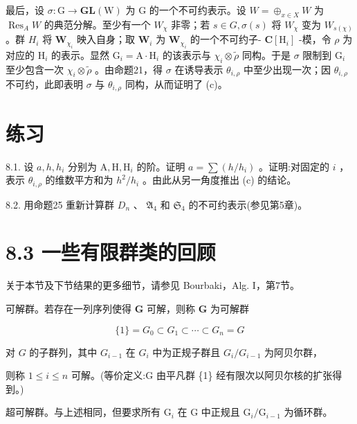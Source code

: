 \documentclass[10pt]{article}
\begin{document}
最后，设 \(\sigma  : \mathrm{G} \rightarrow  \mathbf{{GL}}\left( \mathrm{W}\right)\) 为 \(\mathrm{G}\) 的一个不可约表示。设 \(W = { \oplus  }_{x \in  X}W\) 为 \({\operatorname{Res}}_{A}W\) 的典范分解。至少有一个 \({W}_{\chi }\) 非零；若 \(s \in  G,\sigma \left( s\right)\) 将 \({W}_{\chi }\) 变为 \({W}_{s\left( \chi \right) }\) 。群 \({H}_{i}\) 将 \({\mathbf{W}}_{{\chi }_{i}}\) 映入自身；取 \({\mathbf{W}}_{i}\) 为 \({\mathbf{W}}_{{\chi }_{i}}\) 的一个不可约子- \(\mathbf{C}\left\lbrack  {\mathrm{H}}_{i}\right\rbrack\) -模，令 \(\rho\) 为对应的 \({\mathrm{H}}_{i}\) 的表示。显然 \({\mathrm{G}}_{i} = \mathrm{A} \cdot  {\mathrm{H}}_{i}\) 的该表示与 \({\chi }_{i} \otimes  \widetilde{\rho }\) 同构。于是 \(\sigma\) 限制到 \({\mathrm{G}}_{i}\) 至少包含一次 \({\chi }_{i} \otimes  \widetilde{\rho }\) 。由命题21，得 \(\sigma\) 在诱导表示 \({\theta }_{i,\rho }\) 中至少出现一次；因 \({\theta }_{i,\rho }\) 不可约，此即表明 \(\sigma\) 与 \({\theta }_{i,\rho }\) 同构，从而证明了 (c)。

\section*{练习}

8.1. 设 \(a,h,{h}_{i}\) 分别为 \(\mathrm{A},\mathrm{H},{\mathrm{H}}_{i}\) 的阶。证明 \(a = \sum \left( {h/{h}_{i}}\right)\) 。证明:对固定的 \(i\) ，表示 \({\theta }_{i,\rho }\) 的维数平方和为 \({h}^{2}/{h}_{i}\) 。由此从另一角度推出 (c) 的结论。

8.2. 用命题25 重新计算群 \({D}_{n}\) 、 \({\mathfrak{A}}_{4}\) 和 \({\mathfrak{S}}_{4}\) 的不可约表示(参见第5章)。

\section*{8.3 一些有限群类的回顾}

关于本节及下节结果的更多细节，请参见 Bourbaki，Alg. I，第7节。

可解群。若存在一列序列使得 \(\mathbf{G}\) 可解，则称 \(\mathbf{G}\) 为可解群

\[
\{ 1\}  = {G}_{0} \subset  {G}_{1} \subset  \cdots  \subset  {G}_{n} = G
\]

对 \(G\) 的子群列，其中 \({G}_{i - 1}\) 在 \({G}_{i}\) 中为正规子群且 \({G}_{i}/{G}_{i - 1}\) 为阿贝尔群，

则称 \(1 \leq  i \leq  n\) 可解。(等价定义:G 由平凡群 \{1\} 经有限次以阿贝尔核的扩张得到。)

超可解群。与上述相同，但要求所有 \({\mathrm{G}}_{i}\) 在 \(\mathrm{G}\) 中正规且 \({\mathrm{G}}_{i}/{\mathrm{G}}_{i - 1}\) 为循环群。
\end{document}

